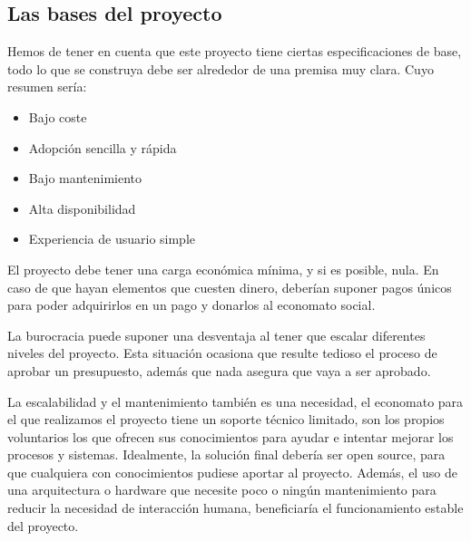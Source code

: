 \subsection{Las bases del proyecto}
Hemos de tener en cuenta que este proyecto tiene ciertas especificaciones de base, todo lo que se construya debe ser alrededor de una premisa muy clara. Cuyo resumen sería:
\begin{itemize}
    \item Bajo coste
    \item Adopción sencilla y rápida
    \item Bajo mantenimiento
    \item Alta disponibilidad
    \item Experiencia de usuario simple
\end{itemize}
El proyecto debe tener una carga económica mínima, y si es posible, nula.
En caso de que hayan elementos que cuesten dinero, deberían suponer pagos únicos para poder adquirirlos en un pago y donarlos al economato social.
\par La burocracia puede suponer una desventaja al tener que escalar diferentes niveles del proyecto. Esta situación ocasiona que resulte tedioso el proceso de aprobar un presupuesto,
además que nada asegura que vaya a ser aprobado.
\par La escalabilidad y el mantenimiento también es una necesidad, el economato para el que realizamos el proyecto tiene un soporte técnico limitado, son los propios voluntarios los que ofrecen sus conocimientos para ayudar e intentar mejorar los procesos y sistemas. Idealmente, la solución final debería ser open source, para que cualquiera con conocimientos pudiese aportar al proyecto. Además, el uso de una arquitectura o hardware que necesite poco o ningún mantenimiento para reducir la necesidad de interacción humana, beneficiaría el funcionamiento estable del proyecto.
\clearpage
